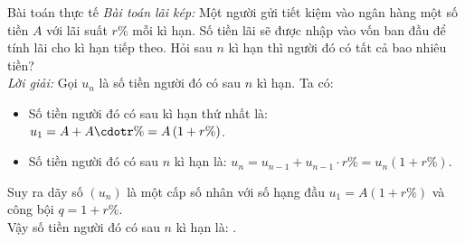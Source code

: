 \begin{dang}{Bài toán thực tế}
	\textit{Bài toán lãi kép:} Một người gửi tiết kiệm vào ngân hàng một số tiền $A$ với lãi suất $r\%$ mỗi kì hạn. Số tiền lãi sẽ được nhập vào vốn ban đầu để tính lãi cho kì hạn tiếp theo. Hỏi sau $n$ kì hạn thì người đó có tất cả bao nhiêu tiền?\\
	\textit{Lời giải:} Gọi $u_n$ là số tiền người đó có sau $n$ kì hạn. Ta có:
	\begin{itemize}
		\item Số tiền người đó có sau kì hạn thứ nhất là: $u_1=A+A\cdotr\%=A\left(1+r\%\right)$.
		\item Số tiền người đó có sau $n$ kì hạn là: $u_n=u_{n-1}+u_{n-1}\cdot r\%=u_n\left(1+r\%\right)$.
	\end{itemize}
	Suy ra dãy số $(u_n)$ là một cấp số nhân với số hạng đầu $u_1=A\left(1+r\%\right)$ và công bội $q=1+r\%$.\\
	Vậy số tiền người đó có sau $n$ kì hạn là: .
\end{dang}

